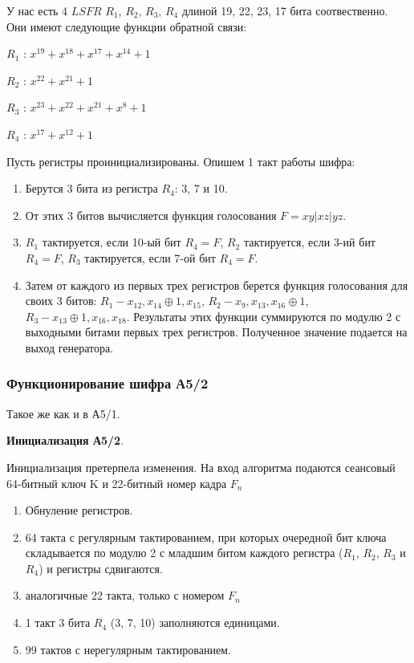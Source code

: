\documentclass[colorthm]{./civarticle}
\begin{document}
У нас есть 4 $LSFR$ $R_1$, $R_2$, $R_3$, $R_4$ длиной 19, 22, 23, 17 бита соотвественно. Они имеют следующие функции обратной связи:

$R_1$ : $x^{19} + x^{18} + x^{17} + x^{14} + 1$

$R_2$ : $x^{22} + x^{21} + 1$

$R_3$ : $x^{23} + x^{22} + x^{21} + x^{8} + 1$

$R_4$ : $x^{17} + x^{12} + 1$

Пусть регистры проинициализированы. Опишем 1 такт работы шифра:

\begin{enumerate}
        \item Берутся 3 бита из регистра $R_4$: 3, 7 и 10.
        \item От этих 3 битов вычисляется функция голосования $F=xy|xz|yz$.
        \item $R_1$ тактируется, если 10-ый бит $R_4 = F$, $R_2$ тактируется, если 3-ий бит $R_4 = F$, $R_3$ тактируется, если 7-ой бит $R_4 = F$.
        \item Затем от каждого из первых трех регистров берется функция голосования для своих 3 битов: $R_1 - x_{12}, x_{14} \oplus 1, x_{15}$, $R_2 - x_{9}, x_{13}, x_{16} \oplus 1$, $R_3 - x_{13} \oplus 1, x_{16}, x_{18}$. Результаты этих функции суммируются по модулю 2 с выходными битами первых трех регистров. Полученное значение подается на выход генератора.
\end{enumerate}

\subsubsection{Функционирование шифра А5/2}

Такое же как и в А5/1.

\textbf{Инициализация А5/2}.

Инициализация претерпела изменения. На вход алгоритма подаются сеансовый 64-битный ключ K и 22-битный номер кадра $F_n$

\begin{enumerate}
        \item Обнуление регистров.
        \item 64 такта с регулярным тактированием, при которых очередной бит ключа складывается по модулю 2 с младшим битом каждого регистра ($R_1$, $R_2$, $R_3$ и $R_4$) и регистры сдвигаются.
        \item аналогичные 22 такта, только с номером $F_n$
        \item 1 такт 3 бита $R_4$ (3, 7, 10) заполняются единицами.
        \item 99 тактов с нерегулярным тактированием.
\end{enumerate}
\end{document}
